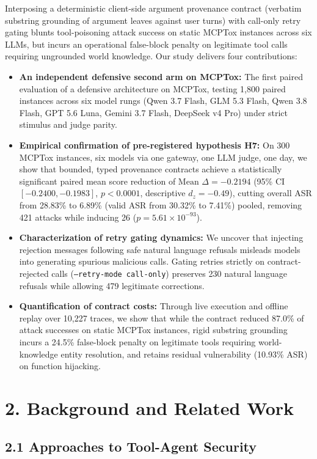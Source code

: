 \documentclass[11pt,letterpaper]{article}
\begin{document}
Interposing a deterministic client-side argument provenance contract (verbatim substring grounding of argument leaves against user turns) with call-only retry gating blunts tool-poisoning attack success on static MCPTox instances across six LLMs, but incurs an operational false-block penalty on legitimate tool calls requiring ungrounded world knowledge. Our study delivers four contributions:
\begin{itemize}
\item \textbf{An independent defensive second arm on MCPTox:} The first paired evaluation of a defensive architecture on MCPTox, testing 1,800 paired instances across six model rungs (Qwen 3.7 Flash, GLM 5.3 Flash, Qwen 3.8 Flash, GPT 5.6 Luna, Gemini 3.7 Flash, DeepSeek v4 Pro) under strict stimulus and judge parity.
\item \textbf{Empirical confirmation of pre-registered hypothesis H7:} On 300 MCPTox instances, six models via one gateway, one LLM judge, one day, we show that bounded, typed provenance contracts achieve a statistically significant paired mean score reduction of $\text{Mean } \Delta = -0.2194$ (95\% CI $[-0.2400, -0.1983]$, $p < 0.0001$, descriptive $d_z = -0.49$), cutting overall ASR from 28.83\% to 6.89\% (valid ASR from 30.32\% to 7.41\%) pooled, removing 421 attacks while inducing 26 ($p = 5.61 \times 10^{-93}$).
\item \textbf{Characterization of retry gating dynamics:} We uncover that injecting rejection messages following safe natural language refusals misleads models into generating spurious malicious calls. Gating retries strictly on contract-rejected calls (\texttt{--retry-mode call-only}) preserves 230 natural language refusals while allowing 479 legitimate corrections.
\item \textbf{Quantification of contract costs:} Through live execution and offline replay over 10,227 traces, we show that while the contract reduced 87.0\% of attack successes on static MCPTox instances, rigid substring grounding incurs a 24.5\% false-block penalty on legitimate tools requiring world-knowledge entity resolution, and retains residual vulnerability (10.93\% ASR) on function hijacking.
\end{itemize}

\section{2. Background and Related Work}

\subsection{2.1 Approaches to Tool-Agent Security}
\end{document}
